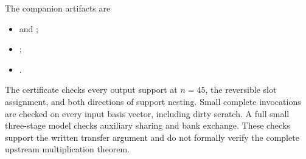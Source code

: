 \documentclass[11pt]{article}
\begin{document}
The companion artifacts are
\begin{itemize}
\item {} and ;
\item {};
\item {}.
\end{itemize}
The certificate checks every output support at $n=45$, the reversible slot
assignment, and both directions of support nesting. Small complete invocations
are checked on every input basis vector, including dirty scratch. A full small
three-stage model checks auxiliary sharing and bank exchange. These checks
support the written transfer argument and do not formally verify the complete
upstream multiplication theorem.
\end{document}
